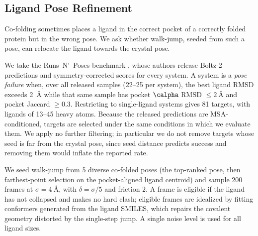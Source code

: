 
\subsection{Ligand Pose Refinement}
\label{sec:docking-results}

Co-folding sometimes places a ligand in the correct pocket of a correctly folded
protein but in the wrong pose. We ask whether walk-jump, seeded from such a
pose, can relocate the ligand towards the crystal pose.

We take the Runs~N'~Poses benchmark \citep{runsnposes}, whose authors release
Boltz-2 predictions and symmetry-corrected scores for every system. A system is
a \emph{pose failure} when, over all released samples (\numrange{22}{25} per
system), the best ligand RMSD exceeds \SI{2}{\angstrom} while that same sample
has pocket $\calpha$ RMSD $\leq\SI{2}{\angstrom}$ and pocket Jaccard
$\geq 0.3$. Restricting to single-ligand systems gives \num{81} targets, with
ligands of \numrange{13}{45} heavy atoms. Because the released predictions
are MSA-conditioned, targets are selected under the same conditions in which we
evaluate them. We apply no further filtering; in particular we do not remove
targets whose seed is far from the crystal pose, since seed distance predicts
success and removing them would inflate the reported rate.

We seed walk-jump from \num{5} diverse co-folded poses (the top-ranked pose, then
farthest-point selection on the pocket-aligned ligand centroid) and sample
$200$ frames at $\sigma=\SI{4}{\angstrom}$, with $\delta=\sigma/5$ and
friction $2$. A frame is eligible if the ligand has not collapsed and makes no
hard clash; eligible frames are idealized by fitting conformers generated from
the ligand SMILES, which repairs the covalent geometry distorted by the
single-step jump. A single noise level is used for all ligand sizes.

